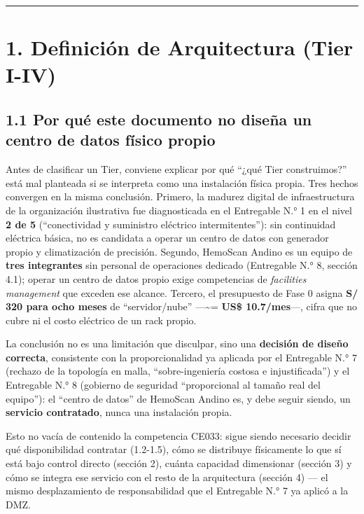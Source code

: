 \documentclass[11pt,a4paper]{article}
\begin{document}
\begin{center}\rule{0.5\linewidth}{0.5pt}\end{center}

\section{1. Definición de Arquitectura (Tier I-IV)}\label{definiciuxf3n-de-arquitectura-tier-i-iv}

\subsection{1.1 Por qué este documento no diseña un centro de datos físico propio}\label{por-quuxe9-este-documento-no-diseuxf1a-un-centro-de-datos-fuxedsico-propio}

Antes de clasificar un Tier, conviene explicar por qué ``¿qué Tier construimos?'' está mal planteada si se interpreta como una instalación física propia. Tres hechos convergen en la misma conclusión. Primero, la madurez digital de infraestructura de la organización ilustrativa fue diagnosticada en el Entregable N.° 1 en el nivel \textbf{2 de 5} (``conectividad y suministro eléctrico intermitentes''): sin continuidad eléctrica básica, no es candidata a operar un centro de datos con generador propio y climatización de precisión. Segundo, HemoScan Andino es un equipo de \textbf{tres integrantes} sin personal de operaciones dedicado (Entregable N.° 8, sección 4.1); operar un centro de datos propio exige competencias de \emph{facilities management} que exceden ese alcance. Tercero, el presupuesto de Fase 0 asigna \textbf{S/ 320 para ocho meses} de ``servidor/nube'' ---\textasciitilde= \textbf{US\$ 10.7/mes}---, cifra que no cubre ni el costo eléctrico de un rack propio.

La conclusión no es una limitación que disculpar, sino una \textbf{decisión de diseño correcta}, consistente con la proporcionalidad ya aplicada por el Entregable N.° 7 (rechazo de la topología en malla, ``sobre-ingeniería costosa e injustificada'') y el Entregable N.° 8 (gobierno de seguridad ``proporcional al tamaño real del equipo''): el ``centro de datos'' de HemoScan Andino es, y debe seguir siendo, un \textbf{servicio contratado}, nunca una instalación propia.

Esto no vacía de contenido la competencia CE033: sigue siendo necesario decidir qué disponibilidad contratar (1.2-1.5), cómo se distribuye físicamente lo que sí está bajo control directo (sección 2), cuánta capacidad dimensionar (sección 3) y cómo se integra ese servicio con el resto de la arquitectura (sección 4) --- el mismo desplazamiento de responsabilidad que el Entregable N.° 7 ya aplicó a la DMZ.
\end{document}
